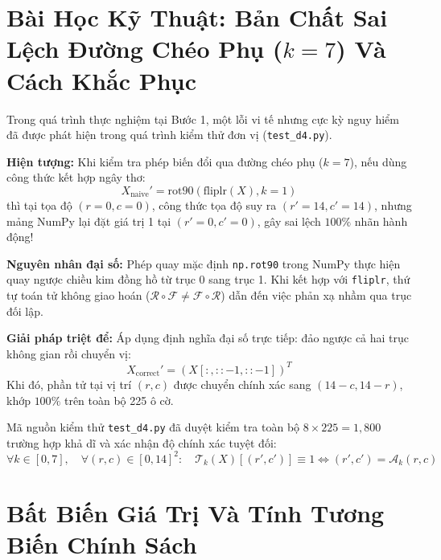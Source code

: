 \documentclass[11pt,a4paper]{report}
\begin{document}
\section{Bài Học Kỹ Thuật: Bản Chất Sai Lệch Đường Chéo Phụ ($k=7$) Và Cách Khắc Phục}

Trong quá trình thực nghiệm tại Bước 1, một lỗi vi tế nhưng cực kỳ nguy hiểm đã được phát hiện trong quá trình kiểm thử đơn vị (\texttt{test\_d4.py}). 

\begin{tcolorbox}[title={Phân tích ca lỗi $k=7$ (Anti-diagonal Discrepancy)}, colframe=alertred]
\textbf{Hiện tượng:} Khi kiểm tra phép biến đổi qua đường chéo phụ ($k=7$), nếu dùng công thức kết hợp ngây thơ:
\begin{equation}
    X_{\text{naive}}' = \text{rot90}(\text{fliplr}(X), k=1)
\end{equation}
thì tại tọa độ $(r=0, c=0)$, công thức tọa độ suy ra $(r'=14, c'=14)$, nhưng mảng NumPy lại đặt giá trị 1 tại $(r'=0, c'=0)$, gây sai lệch $100\%$ nhãn hành động!

\textbf{Nguyên nhân đại số:} Phép quay mặc định \texttt{np.rot90} trong NumPy thực hiện quay ngược chiều kim đồng hồ từ trục 0 sang trục 1. Khi kết hợp với \texttt{fliplr}, thứ tự toán tử không giao hoán ($\mathcal{R} \circ \mathcal{F} \neq \mathcal{F} \circ \mathcal{R}$) dẫn đến việc phản xạ nhầm qua trục đối lập.

\textbf{Giải pháp triệt để:} Áp dụng định nghĩa đại số trực tiếp: đảo ngược cả hai trục không gian rồi chuyển vị:
\begin{equation}
    X_{\text{correct}}' = (X[:, ::-1, ::-1])^T
\end{equation}
Khi đó, phần tử tại vị trí $(r, c)$ được chuyển chính xác sang $(14 - c, 14 - r)$, khớp $100\%$ trên toàn bộ 225 ô cờ.
\end{tcolorbox}

Mã nguồn kiểm thử \texttt{test\_d4.py} đã duyệt kiểm tra toàn bộ $8 \times 225 = 1,800$ trường hợp khả dĩ và xác nhận độ chính xác tuyệt đối:
\begin{equation}
    \forall k \in [0, 7], \quad \forall (r, c) \in [0, 14]^2: \quad \mathcal{T}_k(X)[(r', c')] \equiv 1 \iff (r', c') = \mathcal{A}_k(r, c)
\end{equation}

\section{Bất Biến Giá Trị Và Tính Tương Biến Chính Sách}
\end{document}
